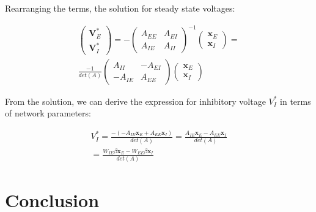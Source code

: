 \documentclass[10pt,twocolumn]{article}
\begin{document}
Rearranging the terms, the solution for steady state voltages:

$$
    \begin{align*}
        \begin{pmatrix}
            \textbf{V}^\ast_E \\ \textbf{V}^\ast_I
        \end{pmatrix}
        =
        -\begin{pmatrix}
             A_{EE} & A_{EI} \\
             A_{IE} & A_{II}
         \end{pmatrix}^{-1}
        \begin{pmatrix}
            \textbf{x}_E \\ \textbf{x}_I
        \end{pmatrix}
        =
        \\
        \frac{-1}{det(A)}
        \begin{pmatrix}
            A_{II}  & -A_{EI} \\
            -A_{IE} & A_{EE}
        \end{pmatrix}
        \begin{pmatrix}
            \textbf{x}_E \\ \textbf{x}_I
        \end{pmatrix}
    \end{align*}
$$

From the solution, we can derive the expression for
inhibitory voltage $V^\ast_I$ in terms of network parameters:

$$
    \begin{align*}
        V^\ast_I
        = \frac{-(- A_{IE}\textbf{x}_E + A_{EE}\textbf{x}_I)}{det(A)}
        = \frac{A_{IE}\textbf{x}_E - A_{EE}\textbf{x}_I}{det(A)}
        \\
        = \frac{W_{IE}\beta \textbf{x}_E - W_{EE}\beta \textbf{x}_I}{det(A)}
    \end{align*}
$$





\section{Conclusion}

\pagebreak

\printbibliography
\end{document}
